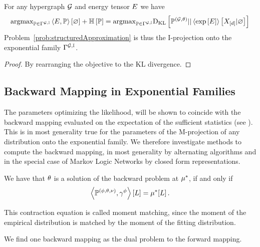 \begin{theorem}
	For any hypergraph $\mathcal{G}$ and energy tensor $E$ we have 
	\begin{align*}
		\mathrm{argmax}_{\mathbb{P}\in \Gamma^{\mathcal{G},\mathbb{I}}} \left\langle E, \mathbb{P}\right\rangle \left[ \varnothing \right]+ \mathbb{H}\left[\mathbb{P}\right]
		= \mathrm{argmax}_{\mathbb{P}\in \Gamma^{\mathcal{G},\mathbb{I}}} \mathrm{D}_{\mathrm{KL}}\left[ \mathbb{P}^{(\mathcal{G},\theta)} || \left\langle \mathrm{exp}\left[E\right]\right\rangle \left[ X_{[d]} | \varnothing \right] \right]
	\end{align*}
	Problem~\ref{prob:structuredApproximation} is thus the I-projection onto the exponential family $\Gamma^{\mathcal{G},\mathbb{I}}$.
\end{theorem}
\begin{proof}
	By rearranging the objective to the KL divergence.
\end{proof}








\subsection{Backward Mapping in Exponential Families}

The parameters optimizing the likelihood, will be shown to coincide with the backward mapping evaluated on the expectation of the sufficient statistics (see ).
This is in most generality true for the parameters of the M-projection of any distribution onto the exponential family.
We therefore investigate methods to compute the backward mapping, in most generality by alternating algorithms and in the special case of Markov Logic Networks by closed form representations.




	We have that $\theta$ is a solution of the backward problem at $\mu^*$, if and only if 
		\[ \left\langle \mathbb{P}^{(\phi,\theta,\nu)},\gamma^{\phi}\right\rangle \left[ L \right] = \mu^*[L] \, . \]

This contraction equation is called moment matching, since the moment of the empirical distribution is matched by the moment of the fitting distribution.

We find one backward mapping as the dual problem to the forward mapping.


